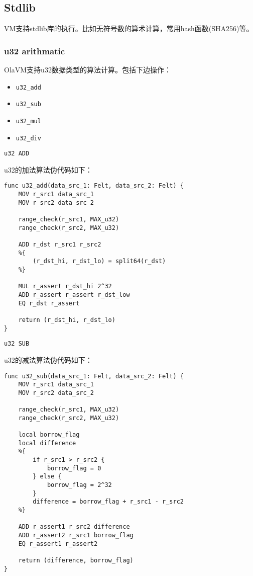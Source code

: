 \subsection{Stdlib}\label{subsec: : stdlib}
VM支持stdlib库的执行。比如无符号数的算术计算，常用hash函数(SHA256)等。
\subsubsection{u32 arithmatic}\label{subsec: u32-arithmatic}
OlaVM支持u32数据类型的算法计算。包括下边操作：
\begin{itemize}
    \item \verb|u32_add|
    \item \verb|u32_sub|
    \item \verb|u32_mul|
    \item \verb|u32_div|
\end{itemize}


\verb|u32 ADD|

u32的加法算法伪代码如下：

\begin{lstlisting}[language={}]
func u32_add(data_src_1: Felt, data_src_2: Felt) {
    MOV r_src1 data_src_1
    MOV r_src2 data_src_2

    range_check(r_src1, MAX_u32)
    range_check(r_src2, MAX_u32)

    ADD r_dst r_src1 r_src2
    %{
        (r_dst_hi, r_dst_lo) = split64(r_dst)
    %}

    MUL r_assert r_dst_hi 2^32
    ADD r_assert r_assert r_dst_low
    EQ r_dst r_assert

    return (r_dst_hi, r_dst_lo)
}
\end{lstlisting}


\verb|u32 SUB|

u32的减法算法伪代码如下：

\begin{lstlisting}[language={}]
func u32_sub(data_src_1: Felt, data_src_2: Felt) {
    MOV r_src1 data_src_1
    MOV r_src2 data_src_2

    range_check(r_src1, MAX_u32)
    range_check(r_src2, MAX_u32)

    local borrow_flag
    local difference
    %{
        if r_src1 > r_src2 {
            borrow_flag = 0
        } else {
            borrow_flag = 2^32
        }
        difference = borrow_flag + r_src1 - r_src2
    %}

    ADD r_assert1 r_src2 difference
    ADD r_assert2 r_src1 borrow_flag
    EQ r_assert1 r_assert2

    return (difference, borrow_flag)
}
\end{lstlisting}


